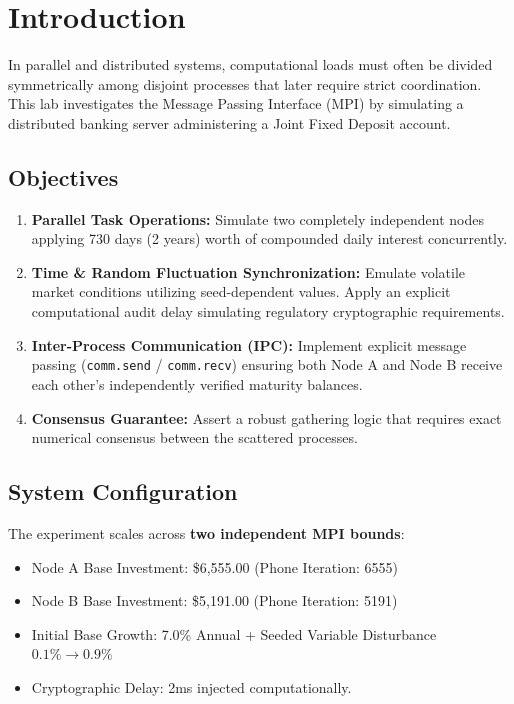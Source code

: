 \documentclass[11pt]{article}
\begin{document}
\section{Introduction}

In parallel and distributed systems, computational loads must often be divided symmetrically among disjoint processes that later require strict coordination. This lab investigates the Message Passing Interface (MPI) by simulating a distributed banking server administering a Joint Fixed Deposit account.

\subsection{Objectives}
\begin{enumerate}
    \item \textbf{Parallel Task Operations:} Simulate two completely independent nodes applying 730 days (2 years) worth of compounded daily interest concurrently.
    \item \textbf{Time \& Random Fluctuation Synchronization:} Emulate volatile market conditions utilizing seed-dependent values. Apply an explicit computational audit delay simulating regulatory cryptographic requirements.
    \item \textbf{Inter-Process Communication (IPC):} Implement explicit message passing (\texttt{comm.send} / \texttt{comm.recv}) ensuring both Node A and Node B receive each other's independently verified maturity balances.
    \item \textbf{Consensus Guarantee:} Assert a robust gathering logic that requires exact numerical consensus between the scattered processes.
\end{enumerate}

\subsection{System Configuration}

\begin{shadedbox}
The experiment scales across \textbf{two independent MPI bounds}:
\begin{itemize}[leftmargin=*]
    \item Node A Base Investment: \$6,555.00 (Phone Iteration: 6555) 
    \item Node B Base Investment: \$5,191.00 (Phone Iteration: 5191) 
    \item Initial Base Growth: 7.0\% Annual + Seeded Variable Disturbance $0.1\% \to 0.9\%$
    \item Cryptographic Delay: 2ms injected computationally.
\end{itemize}
\end{shadedbox}
\end{document}
